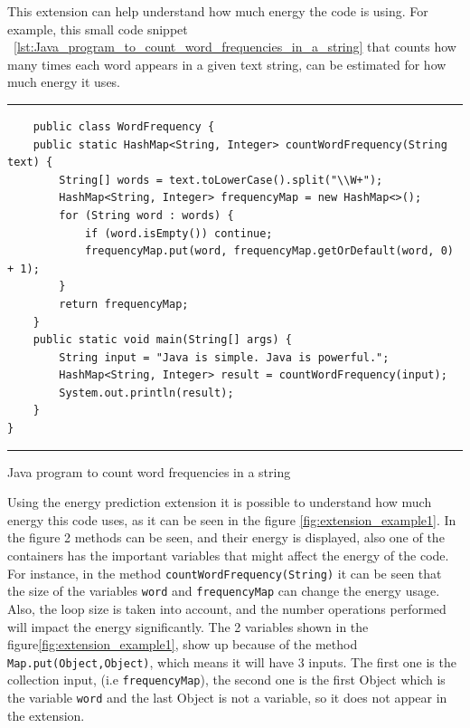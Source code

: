 This extension can help understand how much energy the code is using.
For example, this small code snippet ~\ref{lst:Java_program_to_count_word_frequencies_in_a_string} that counts how many times each word appears in a given text string, can be estimated for how much energy it uses.

\begin{listing}[H]
\noindent\rule{\linewidth}{0.4pt}
\begin{verbatim}
    public class WordFrequency {
    public static HashMap<String, Integer> countWordFrequency(String text) {
        String[] words = text.toLowerCase().split("\\W+");
        HashMap<String, Integer> frequencyMap = new HashMap<>();
        for (String word : words) {
            if (word.isEmpty()) continue; 
            frequencyMap.put(word, frequencyMap.getOrDefault(word, 0) + 1);
        }
        return frequencyMap;
    }
    public static void main(String[] args) {
        String input = "Java is simple. Java is powerful.";
        HashMap<String, Integer> result = countWordFrequency(input);
        System.out.println(result);
    }
}
\end{verbatim}
\noindent\rule{\linewidth}{0.4pt}
\caption{Java program to count word frequencies in a string}            
\label{lst:Java_program_to_count_word_frequencies_in_a_string}
\end{listing}

Using the energy prediction extension it is possible to understand how much energy this code uses, as it can be seen in the figure \ref{fig:extension_example1}.
In the figure 2 methods can be seen, and their energy is displayed, also one of the containers has the important variables that might affect the energy of the code. For instance, in the method \texttt{countWordFrequency(String)} it can be seen that the size of the variables \texttt{word} and \texttt{frequencyMap} can change the energy usage. Also, the loop size is taken into account, and the number operations performed will impact the energy significantly.
The 2 variables shown in the figure\ref{fig:extension_example1}, show up because of the method \texttt{Map.put(Object,Object)}, which means it will have 3 inputs. The first one is the collection input, (i.e \texttt{frequencyMap}), the second one is the first Object which is the variable \texttt{word} and the last Object is not a variable, so it does not appear in the extension.


